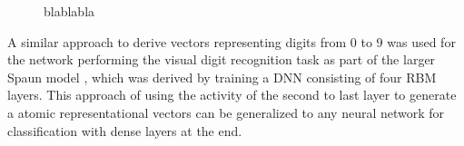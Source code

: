 \begin{figure}[t]
	\centering
	\caption{blablabla}
	\label{fig:cnn_arch}
\end{figure}
A similar approach to derive vectors representing digits from $0$ to $9$ was used for the network performing the visual digit recognition task as part of the larger \ac{Spaun} model \cite{Eliasmith2012}, which was derived by training a \ac{DNN} consisting of four \acl{RBM} layers.
This approach of using the activity of the second to last layer to generate a atomic representational vectors can be generalized to any neural network for classification with dense layers at the end.

